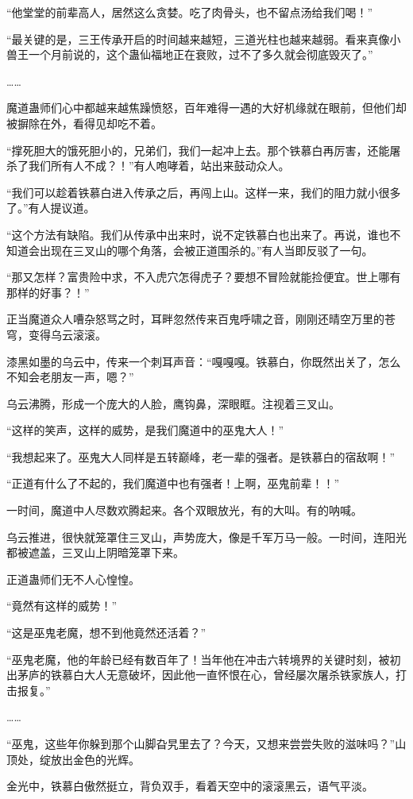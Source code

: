 \begin{this_body}
“他堂堂的前辈高人，居然这么贪婪。吃了肉骨头，也不留点汤给我们喝！”

“最关键的是，三王传承开启的时间越来越短，三道光柱也越来越弱。看来真像小兽王一个月前说的，这个蛊仙福地正在衰败，过不了多久就会彻底毁灭了。”

……

魔道蛊师们心中都越来越焦躁愤怒，百年难得一遇的大好机缘就在眼前，但他们却被摒除在外，看得见却吃不着。

“撑死胆大的饿死胆小的，兄弟们，我们一起冲上去。那个铁慕白再厉害，还能屠杀了我们所有人不成？！”有人咆哮着，站出来鼓动众人。

“我们可以趁着铁慕白进入传承之后，再闯上山。这样一来，我们的阻力就小很多了。”有人提议道。

“这个方法有缺陷。我们从传承中出来时，说不定铁慕白也出来了。再说，谁也不知道会出现在三叉山的哪个角落，会被正道围杀的。”有人当即反驳了一句。

“那又怎样？富贵险中求，不入虎穴怎得虎子？要想不冒险就能捡便宜。世上哪有那样的好事？！”

正当魔道众人嘈杂怒骂之时，耳畔忽然传来百鬼呼啸之音，刚刚还晴空万里的苍穹，变得乌云滚滚。

漆黑如墨的乌云中，传来一个刺耳声音：“嘎嘎嘎。铁慕白，你既然出关了，怎么不知会老朋友一声，嗯？”

乌云沸腾，形成一个庞大的人脸，鹰钩鼻，深眼眶。注视着三叉山。

“这样的笑声，这样的威势，是我们魔道中的巫鬼大人！”

“我想起来了。巫鬼大人同样是五转巅峰，老一辈的强者。是铁慕白的宿敌啊！”

“正道有什么了不起的，我们魔道中也有强者！上啊，巫鬼前辈！！”

一时间，魔道中人尽数欢腾起来。各个双眼放光，有的大叫。有的呐喊。

乌云推进，很快就笼罩住三叉山，声势庞大，像是千军万马一般。一时间，连阳光都被遮盖，三叉山上阴暗笼罩下来。

正道蛊师们无不人心惶惶。

“竟然有这样的威势！”

“这是巫鬼老魔，想不到他竟然还活着？”

“巫鬼老魔，他的年龄已经有数百年了！当年他在冲击六转境界的关键时刻，被初出茅庐的铁慕白大人无意破坏，因此他一直怀恨在心，曾经屡次屠杀铁家族人，打击报复。”

……

“巫鬼，这些年你躲到那个山脚旮旯里去了？今天，又想来尝尝失败的滋味吗？”山顶处，绽放出金色的光辉。

金光中，铁慕白傲然挺立，背负双手，看着天空中的滚滚黑云，语气平淡。


\end{this_body}
